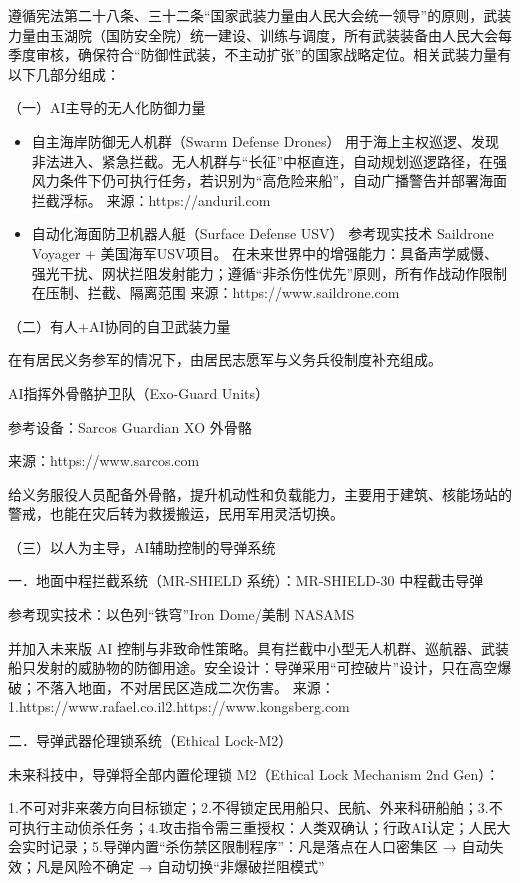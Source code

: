 遵循宪法第二十八条、三十二条``国家武装力量由人民大会统一领导''的原则，武装力量由玉湖院（国防安全院）统一建设、训练与调度，所有武装装备由人民大会每季度审核，确保符合``防御性武装，不主动扩张''的国家战略定位。相关武装力量有以下几部分组成：

（一）AI主导的无人化防御力量

\begin{itemize}
\item
  自主海岸防御无人机群（Swarm Defense Drones）
  用于海上主权巡逻、发现非法进入、紧急拦截。无人机群与``长征''中枢直连，自动规划巡逻路径，在强风力条件下仍可执行任务，若识别为``高危险来船''，自动广播警告并部署海面拦截浮标。
  来源：https://anduril.com
\item
  自动化海面防卫机器人艇（Surface Defense USV）
  参考现实技术 Saildrone Voyager + 美国海军USV项目。 在未来世界中的增强能力：具备声学威慑、强光干扰、网状拦阻发射能力；遵循``非杀伤性优先''原则，所有作战动作限制在压制、拦截、隔离范围
  来源：https://www.saildrone.com
\end{itemize}

（二）有人+AI协同的自卫武装力量

在有居民义务参军的情况下，由居民志愿军与义务兵役制度补充组成。

AI指挥外骨骼护卫队（Exo-Guard Units）

参考设备：Sarcos Guardian XO 外骨骼

来源：https://www.sarcos.com

给义务服役人员配备外骨骼，提升机动性和负载能力，主要用于建筑、核能场站的警戒，也能在灾后转为救援搬运，民用军用灵活切换。

（三）以人为主导，AI辅助控制的导弹系统

一．地面中程拦截系统（MR-SHIELD 系统）：MR-SHIELD-30 中程截击导弹

参考现实技术：以色列``铁穹''Iron Dome/美制 NASAMS

并加入未来版 AI 控制与非致命性策略。具有拦截中小型无人机群、巡航器、武装船只发射的威胁物的防御用途。安全设计：导弹采用``可控破片''设计，只在高空爆破；不落入地面，不对居民区造成二次伤害。 来源：1.https://www.rafael.co.il2.https://www.kongsberg.com

二．导弹武器伦理锁系统（Ethical Lock-M2）

未来科技中，导弹将全部内置伦理锁 M2（Ethical Lock Mechanism 2nd Gen）：

1.不可对非来袭方向目标锁定；2.不得锁定民用船只、民航、外来科研船舶；3.不可执行主动侦杀任务；4.攻击指令需三重授权：人类双确认；行政AI认定；人民大会实时记录；5.导弹内置``杀伤禁区限制程序''：凡是落点在人口密集区 → 自动失效；凡是风险不确定 → 自动切换``非爆破拦阻模式''

